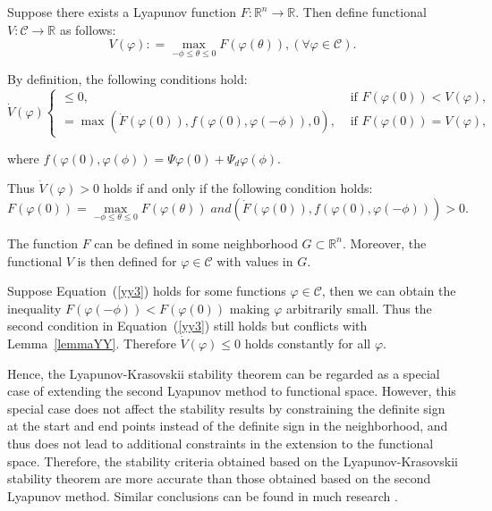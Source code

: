 \documentclass[a4paper]{cas-sc}
\begin{document}
Suppose there exists a Lyapunov function $F:\mathbb{R}^n\rightarrow\mathbb{R}$. Then define functional $V:\mathcal{C}\rightarrow\mathbb{R}$ as follows:
\begin{equation}
  V(\varphi ): = \mathop {\max }\limits_{ -\phi \le \theta  \le 0} F(\varphi (\theta )),(\forall \varphi  \in \mathcal{C}).
  \label{yy1}
\end{equation}

By definition, the following conditions hold:
\begin{equation}
  \dot{V}(\varphi)\left\{\begin{array}{cl}
    \leq 0,                                                          & \text { if } F(\varphi(0))<V(\varphi), \\
    =\max \left(\dot{F}(\varphi(0)), f(\varphi(0), \varphi(-\phi)), 0\right), & \text { if } F(\varphi(0))=V(\varphi),
  \end{array}\right.
\end{equation}

where $f(\varphi(0), \varphi(\phi))=\Psi\varphi(0)+\Psi_d\varphi(\phi)$.

Thus $\dot{V}\left(\varphi\right)>0$ holds if and only if the following condition holds:
\begin{equation}
  F(\varphi (0)) = \mathop {\max }\limits_{ - \phi \le \theta  \le 0} F(\varphi (\theta ))\;and(\dot F(\varphi (0)),f(\varphi(0), \varphi(-\phi))) > 0.
  \label{yy3}
\end{equation}

The function $F$ can be defined in some neighborhood $G\subset\mathbb{R}^n$. Moreover, the functional $V$ is then defined for $\varphi\in\mathcal{C}$ with values in $G$.

Suppose Equation~(\ref{yy3}) holds for some functions $\varphi\in\mathcal{C}$, then we can obtain the inequality $F\left(\varphi\left(-\phi\right)\right)<F\left(\varphi\left(0\right)\right)$ making $\varphi$ arbitrarily small. Thus the second condition in Equation~(\ref{yy3}) still holds but conflicts with Lemma~\ref{lemmaYY}. Therefore $\dot{V}\left(\varphi\right)\le0$ holds constantly for all $\varphi$.

Hence, the Lyapunov-Krasovskii stability theorem can be regarded as a special case of extending the second Lyapunov method to functional space. However, this special case does not affect the stability results by constraining the definite sign at the start and end points instead of the definite sign in the neighborhood, and thus does not lead to additional constraints in the extension to the functional space. Therefore, the stability criteria obtained based on the Lyapunov-Krasovskii stability theorem are more accurate than those obtained based on the second Lyapunov method. Similar conclusions can be found in much research \citep{wang2016fuzzy,lian2020dissipativity}.
\end{document}

